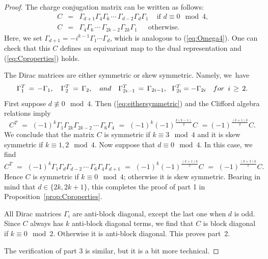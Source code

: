 \documentclass[10pt,a4paper]{amsart}
\begin{document}
\begin{proof}
    The charge conjugation matrix can be written as follows:
\begin{equation}
\label{eq:CCM}
\begin{matrix}
    C & = & \Gamma_{d + 1} \Gamma_4 \Gamma_6 \,\cdots\,
    \Gamma_{d-2} \Gamma_{d} \Gamma_1 \,\,\,\,\, \text{ if $d \equiv 0\! \!\!\!\mod{4}$,}
    \\
    C & = & \!\!\!\!\!\! \Gamma_4  \Gamma_6 \,\cdots\, \Gamma_{2k-2} \Gamma_{2k} \Gamma_1 \,
    \quad \text{ otherwise.}
    \end{matrix}
\end{equation}
    Here, we set $\Gamma_{d + 1} = -i^{k - 1} \Gamma_1 \cdots \Gamma_d$,
    which is analogous to (\ref{eq:Omega4}).    
    One can check that this $C$ defines an equivariant map to the dual representation and 
    (\ref{eq:Cproperties}) holds.
    
The Dirac matrices are either symmetric or skew symmetric. Namely, we~have
\begin{equation}
\label{eq:eithersymmetric}
    \Gamma_1^T\,=\, -\Gamma_1, \quad \Gamma_2^T\, =\,\Gamma_2,  \quad {\rm and} \quad
     \Gamma_{2i - 1}^T \,= \, \Gamma_{2i - 1},\,\,\,\,
     \Gamma_{2i}^T = -\Gamma_{2i} \quad  {\rm for} \,\,\, i \,\geq \,2 .
\end{equation}
First suppose 
  $d \not\equiv 0 \!\! \mod{4}$. Then (\ref{eq:eithersymmetric}) and the Clifford algebra relations imply
        $$
    C^T \,\,=\,\, (-1)^k \Gamma_1 \Gamma_{2k} \Gamma_{2k-2}\, \cdots\,\Gamma_6 \Gamma_4 
    \,\,=\,\, (-1)^k(-1)^{\frac{k(k - 1)}{2}} C \,\,= (-1)^{\frac{(k + 1)k}{2}} C.
    $$
    We conclude that the matrix  $C$ is symmetric if $k \equiv 3 \!\! \mod{4}$
    and it is skew symmetric if $k \equiv 1,2 \!\! \mod{4}$.
          Now suppose that $d \equiv 0 \!\! \mod{4}$. In this case, we find
    $$
    C^T\,\, =\,\, (-1)^k \Gamma_1 \Gamma_{d} \Gamma_{d-2}\, \cdots\, \Gamma_6 \Gamma_4 \Gamma_{d + 1} \,\,
    = \,\,(-1)^k (-1)^{\frac{(k + 1)k}{2}} C \,\,=\,\, (-1)^{\frac{(k + 3)k}{2}} C.
    $$
    Hence $C$ is symmetric if $k \equiv 0 \!\! \!\mod{4}$; otherwise it is skew symmetric. 
    Bearing in mind that $d \in \{2k,2k+1\}$, this completes
    the proof of part 1 in Proposition~\ref{prop:Cproperties}.
    
    All  Dirac matrices $\Gamma_i$ are anti-block diagonal, except the last one when $d$ is odd. Since $C$ always has $k$ anti-block diagonal terms, we find that $C$ is block diagonal if $k \equiv 0 \!\! \mod{2}$. Otherwise it is 
    anti-block diagonal. This proves part~2.

The verification of  part 3 is similar, but it is a bit more technical.
\end{proof}
\end{document}

